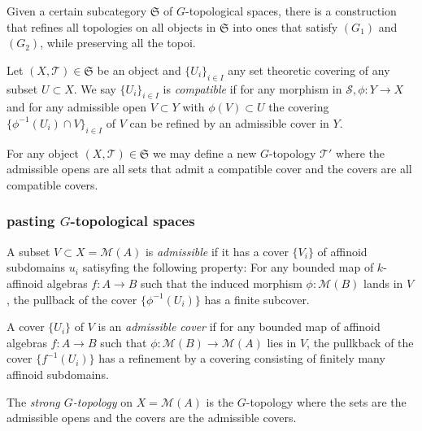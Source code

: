 Given a certain subcategory $\mathfrak{S} $ of $G$-topological spaces, there is a construction that refines all topologies on all objects in $\mathfrak{S} $ into ones that satisfy $(G_1)$ and $(G_2)$, while preserving all the topoi. 

\begin{definition}
	Let $(X, \mathcal{T}) \in \mathfrak{S} $ be an object and $\{U_i\} _{i \in I}$ any set theoretic covering of any subset $U \subset  X$. 
	We say  $\{U_i\} _{i \in I}$ is \emph{compatible} if for any morphism in $\mathcal{S}, \phi: Y \to X $ and for any admissible open $V \subset  Y$ with $\phi(V) \subset  U$ the covering $\{\phi^{-1}(U_i) \cap V\} _{i \in I}$ of $V$ can be refined by an admissible cover in $Y$. 
\end{definition}


\begin{definition}
	For any object $(X, \mathcal{T}) \in \mathfrak{S} $ we may define a new $G$-topology $\mathcal{T} '$ where the admissible opens are all sets that admit a compatible cover and the covers are all compatible covers. 
\end{definition}


\subsubsection{pasting $G$-topological spaces} \label{sec:pasting_$g$-topological_spaces}

\begin{definition}\label{def:admissible_open_cover}
	A subset $V \subset X = \mathcal{M} (A)$ is \emph{admissible} if it has a cover $\{V_i\} $ of affinoid subdomains $u_i$ satisyfing the following property:
	For any bounded map of $k$-affinoid algebras $f: A \to B$ such that the induced morphism  $\phi: \mathcal{M} (B)$ lands in $V$, the pullback of the cover $\{\phi^{-1}(U_i)\} $ has a finite subcover. 

	A cover $\{U_i\} $ of $V$ is an \emph{admissible cover} if for any bounded map of affinoid algebras $f:A \to B$ such that $\phi: \mathcal{M} (B) \to \mathcal{M} (A)$ lies in $V$, the pullkback of the cover $\{f^{-1}(U_i)\} $ has a refinement by a  covering consisting of finitely many affinoid subdomains. 
\end{definition}

\begin{definition}\label{def:strong_g_topology}
	The \emph{strong $G$-topology} on $X = \mathcal{M} (A)$ is the $G$-topology where the sets are the admissible opens and the covers are the admissible covers. 
\end{definition}

